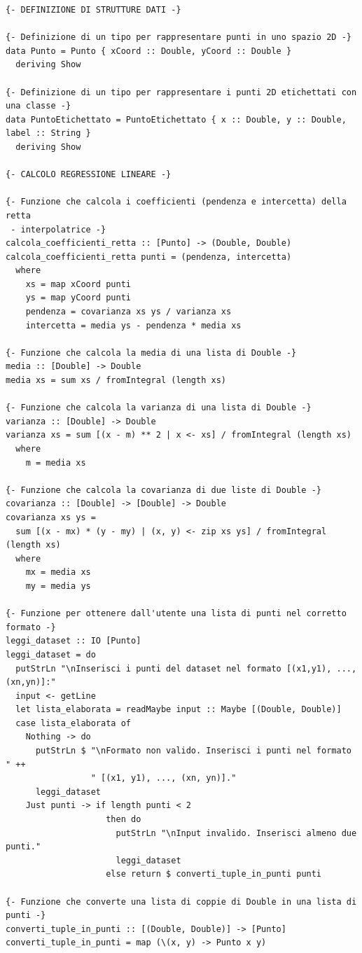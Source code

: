 \documentclass[11pt]{article}
\theoremstyle{definition}
\begin{document}
\begin{verbatim}
{- DEFINIZIONE DI STRUTTURE DATI -}

{- Definizione di un tipo per rappresentare punti in uno spazio 2D -}
data Punto = Punto { xCoord :: Double, yCoord :: Double } 
  deriving Show

{- Definizione di un tipo per rappresentare i punti 2D etichettati con una classe -}
data PuntoEtichettato = PuntoEtichettato { x :: Double, y :: Double, label :: String } 
  deriving Show

{- CALCOLO REGRESSIONE LINEARE -}

{- Funzione che calcola i coefficienti (pendenza e intercetta) della retta 
 - interpolatrice -}
calcola_coefficienti_retta :: [Punto] -> (Double, Double)
calcola_coefficienti_retta punti = (pendenza, intercetta)
  where
    xs = map xCoord punti
    ys = map yCoord punti
    pendenza = covarianza xs ys / varianza xs
    intercetta = media ys - pendenza * media xs

{- Funzione che calcola la media di una lista di Double -}
media :: [Double] -> Double
media xs = sum xs / fromIntegral (length xs)

{- Funzione che calcola la varianza di una lista di Double -}
varianza :: [Double] -> Double
varianza xs = sum [(x - m) ** 2 | x <- xs] / fromIntegral (length xs)
  where
    m = media xs

{- Funzione che calcola la covarianza di due liste di Double -}
covarianza :: [Double] -> [Double] -> Double
covarianza xs ys = 
  sum [(x - mx) * (y - my) | (x, y) <- zip xs ys] / fromIntegral (length xs)
  where
    mx = media xs
    my = media ys

{- Funzione per ottenere dall'utente una lista di punti nel corretto formato -}
leggi_dataset :: IO [Punto]
leggi_dataset = do
  putStrLn "\nInserisci i punti del dataset nel formato [(x1,y1), ..., (xn,yn)]:"
  input <- getLine
  let lista_elaborata = readMaybe input :: Maybe [(Double, Double)]
  case lista_elaborata of
    Nothing -> do
      putStrLn $ "\nFormato non valido. Inserisci i punti nel formato " ++ 
                 " [(x1, y1), ..., (xn, yn)]."
      leggi_dataset
    Just punti -> if length punti < 2
                    then do
                      putStrLn "\nInput invalido. Inserisci almeno due punti."
                      leggi_dataset
                    else return $ converti_tuple_in_punti punti

{- Funzione che converte una lista di coppie di Double in una lista di punti -}
converti_tuple_in_punti :: [(Double, Double)] -> [Punto]
converti_tuple_in_punti = map (\(x, y) -> Punto x y)


\end{verbatim}
\end{document}
